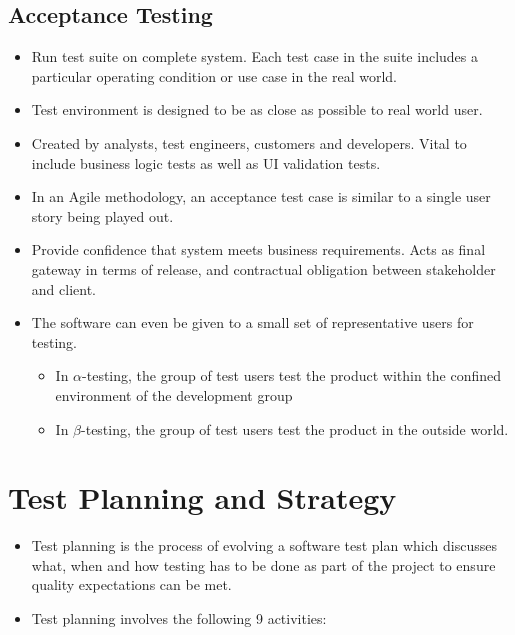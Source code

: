 \documentclass{article}
\begin{document}
\subsection{Acceptance Testing}
\begin{itemize}
    \item Run test suite on complete system. Each test case in the suite includes a particular operating condition or use case in the real world. 
    
    \item Test environment is designed to be as close as possible to real world user. 
    
    \item Created by analysts, test engineers, customers and developers. Vital to include business logic tests as well as UI validation tests. 
    
    \item In an Agile methodology, an acceptance test case is similar to a single user story being played out. 
    
    \item Provide confidence that system meets business requirements. Acts as final gateway in terms of release, and contractual obligation between stakeholder and client. 
    
    \item The software can even be given to a small set of representative users for testing.
    \begin{itemize}
        \item In $\alpha$-testing, the group of test users test the product within the confined environment of the development group
        
        \item In $\beta$-testing, the group of test users test the product in the outside world. 
    \end{itemize}
\end{itemize}

\section{Test Planning and Strategy}
\begin{itemize}
    \item Test planning is the process of evolving a software test plan which discusses what, when and how testing has to be done as part of the project to ensure quality expectations can be met. 
    
    \item Test planning involves the following 9 activities:
\end{itemize}
\end{document}
